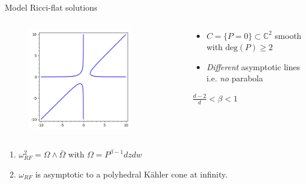 \documentclass{beamer}
\newcommand{\C}{\mathbb{C}}
\begin{document}
\begin{frame}{Model Ricci-flat solutions}
\begin{columns}	
	\begin{column}{0.48\textwidth}
		\begin{figure}
			\includegraphics[width=0.8\textwidth,height=0.8\textheight,keepaspectratio]{cubic}
		\end{figure}
	\end{column}
	\begin{column}{0.48\textwidth}
		\begin{itemize}
			\item \(C=\{P=0\} \subset \C^2\) smooth with \(\mbox{deg}(P)\geq 2\)
			\item \emph{Different} asymptotic lines \\
			i.e. \emph{no} parabola
		\end{itemize}
	\begin{center}
		\begin{minipage}{0.4\textwidth}
			\begin{block}{}
				\(\frac{d-2}{d}<\beta<1\)
			\end{block}
		\end{minipage}
	\end{center}
	\end{column}
\end{columns}	
\begin{theorem}[existence]
	\begin{enumerate}
		\item \(\omega_{RF}^2 = \Omega \wedge \bar{\Omega}\) with \(\Omega = P^{\beta-1} dz dw \) 
		\item \(\omega_{RF}\) is asymptotic to a polyhedral K\"ahler cone at infinity.
	\end{enumerate}
\end{theorem}
\end{frame}
\end{document}
